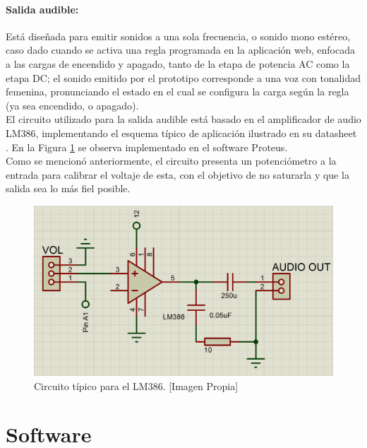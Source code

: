 	\paragraph{Salida audible:}
		Está diseñada para emitir sonidos a una sola frecuencia, o sonido mono estéreo, caso dado cuando se activa una regla programada en la aplicación web, enfocada a las cargas de encendido y apagado, tanto de la etapa de potencia AC como la etapa DC; el sonido emitido por el prototipo corresponde a una voz con tonalidad femenina, pronunciando el estado en el cual se configura la carga según la regla (ya sea encendido, o apagado).\\
		
		El circuito utilizado para la salida audible está basado en el amplificador de audio LM386, implementando el esquema típico de aplicación ilustrado en su datasheet \cite{LM386}. En la Figura \ref{fig:AUD} se observa implementado en el software Proteus.\\
		
		Como se mencionó anteriormente, el circuito presenta un potenciómetro a la entrada para calibrar el voltaje de esta, con el objetivo de no saturarla y que la salida sea lo más fiel posible.\\
		
		\begin{figure}[H]
			\centering
			\caption[Circuito típico para el LM386.]{Circuito típico para el LM386.  [Imagen Propia]}
			\label{fig:AUD}
			\includegraphics[width=0.7\linewidth]{Imagenes/AUD}
		\end{figure}		
				
\section{Software}

